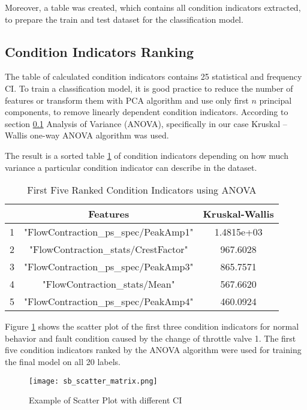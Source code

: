 Moreover, a table was created, which contains all condition indicators
extracted, to prepare the train and test dataset for the classification
model.

\subsection{Condition Indicators Ranking}
The table of calculated condition indicators contains 25 statistical and
frequency CI. To train a classification model, it is good practice to
reduce the number of features or transform them with PCA algorithm and use
only first $n$ principal components, to remove linearly dependent condition
indicators.  According to section \ref{} Analysis of Variance (ANOVA),
specifically in our case Kruskal – Wallis one-way ANOVA algorithm was used. 


The result is a sorted table \ref{tab:sorted_ci} of condition indicators depending on
how much variance a particular condition indicator can describe in the
dataset.

\begin{table}[h]
        \centering
    \begin{tabular} {|c|c|c|} \hline
          & Features & Kruskal-Wallis \\ \hline
        1 & "FlowContraction\_ps\_spec/PeakAmp1" & 1.4815e+03 \\ \hline
        2 & "FlowContraction\_stats/CrestFactor" & 967.6028 \\ \hline
        3 & "FlowContraction\_ps\_spec/PeakAmp3" & 865.7571 \\ \hline
        4 & "FlowContraction\_stats/Mean" & 567.6620 \\ \hline
        5 & "FlowContraction\_ps\_spec/PeakAmp4" & 460.0924 \\ \hline
    \end{tabular}
    \caption{First Five Ranked Condition Indicators using ANOVA}
    \label{tab:sorted_ci}
\end{table}

Figure \ref{fig:sb_scatt_mat} shows the scatter plot of the first three condition
indicators for normal behavior and fault condition caused by the change of
throttle valve 1.
The first five condition indicators ranked by the ANOVA algorithm were used
for training the final model on all 20 labels.

\begin{figure}[h!]
    \centering
    \texttt{[image: sb\_scatter\_matrix.png]}
    \caption{Example of Scatter Plot with different CI}
    \label{fig:sb_scatt_mat}
\end{figure}


